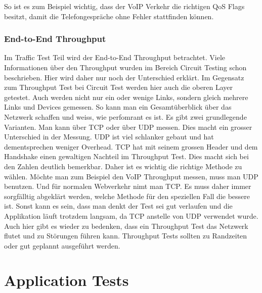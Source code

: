 \documentclass[a4,12pt]{scrartcl}
\begin{document}
So ist es zum Beispiel wichtig, dass der VoIP Verkehr die richtigen QoS Flags besitzt, damit die Telefongespräche ohne Fehler stattfinden können. 
\subsubsection{End-to-End Throughput}
Im Traffic Test Teil wird der End-to-End Throughput betrachtet. Viele Informationen über den Throughput wurden im Bereich Circuit Testing schon beschrieben. Hier wird daher nur noch der Unterschied erklärt.\newline\newline
Im Gegensatz zum Throughput Test bei Circuit Test werden hier auch die oberen Layer getestet. Auch werden nicht nur ein oder wenige Links, sondern gleich mehrere Links und Devices gemessen.
So kann man ein Gesamtüberblick über das Netzwerk schaffen und weiss, wie perfomrant es ist.\newline\newline
Es gibt zwei grundlegende Varianten. Man kann über TCP oder über UDP messen. Dies macht ein grosser Unterschied in der Messung. 
UDP ist viel schlanker gebaut und hat dementsprechen weniger Overhead. TCP hat mit seinem grossen Header und dem Handshake einen gewaltigen Nachteil im Throughput Test. Dies macht sich bei den Zahlen deutlich bemerkbar.\newline\newline
Daher ist es wichtig die richtige Methode zu wählen.
Möchte man zum Beispiel den VoIP Throughput messen, muss man UDP benutzen. Und für normalen Webverkehr nimt man TCP. Es muss daher immer sorgfälltig abgeklärt werden, welche Methode für den speziellen Fall die bessere ist. Sonst kann es sein, dass man denkt der Test sei gut verlaufen und die Applikation läuft trotzdem langsam, da TCP anstelle von UDP verwendet wurde.\newline\newline
Auch hier gibt es wieder zu bedenken, dass ein Throughput Test das Netzwerk flutet und zu Störungen führen kann. Throughput Tests sollten zu Randzeiten oder gut geplannt ausgeführt werden. 

\section{Application Tests}
\end{document}
